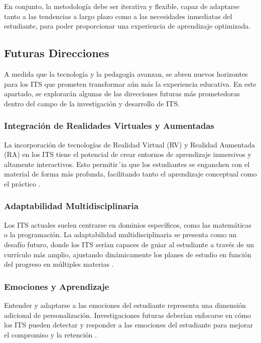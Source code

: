 En conjunto, la metodología debe ser iterativa y flexible, capaz de adaptarse tanto a las tendencias a largo plazo como a las necesidades inmediatas del estudiante, para poder proporcionar una experiencia de aprendizaje optimizada.


\subsection{Futuras Direcciones} 

A medida que la tecnología y la pedagogía avanzan, se abren nuevos horizontes para los ITS que prometen transformar aún más la experiencia educativa. En este apartado, se explorarán algunas de las direcciones futuras más prometedoras dentro del campo de la investigación y desarrollo de ITS.

\subsubsection{Integración de Realidades Virtuales y Aumentadas}

La incorporación de tecnologías de Realidad Virtual (RV) y Realidad Aumentada (RA) en los ITS tiene el potencial de crear entornos de aprendizaje inmersivos y altamente interactivos. Esto permitir´ia que los estudiantes se enganchen con el material de forma más profunda, facilitando tanto el aprendizaje conceptual como el práctico \cite{Radianti2020}.

\subsubsection{Adaptabilidad Multidisciplinaria}

Los ITS actuales suelen centrarse en dominios específicos, como las matemáticas o la programación. La adaptabilidad multidisciplinaria se presenta como un desafío futuro, donde los ITS serían capaces de guiar al estudiante a través de un currículo más amplio, ajustando dinámicamente los planes de estudio en función del progreso en múltiples materias \cite{Aleven2022}.

\subsubsection{Emociones y Aprendizaje}

Entender y adaptarse a las emociones del estudiante representa una dimensión adicional de personalización. Investigaciones futuras deberían enfocarse en cómo los ITS pueden detectar y responder a las emociones del estudiante para mejorar el compromiso y la retención \cite{DMello2013}.

